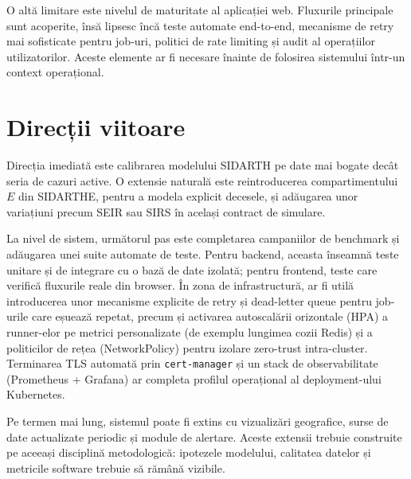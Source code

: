 O altă limitare este nivelul de maturitate al aplicației web. Fluxurile principale
sunt acoperite, însă lipsesc încă teste automate end-to-end, mecanisme de retry mai
sofisticate pentru job-uri, politici de rate limiting și audit al operațiilor
utilizatorilor. Aceste elemente ar fi necesare înainte de folosirea sistemului într-un
context operațional.

\section{Direcții viitoare}
\label{sec:directii_viitoare}

Direcția imediată este calibrarea modelului SIDARTH pe date mai bogate decât
seria de cazuri active. O extensie naturală este reintroducerea compartimentului
$E$ din SIDARTHE, pentru a modela explicit decesele, și adăugarea unor variațiuni
precum SEIR sau SIRS în același contract de simulare.

La nivel de sistem, următorul pas este completarea campaniilor de benchmark și
adăugarea unei suite automate de teste. Pentru backend, aceasta înseamnă teste
unitare și de integrare cu o bază de date izolată; pentru frontend, teste care
verifică fluxurile reale din browser. În zona de infrastructură, ar fi utilă
introducerea unor mecanisme explicite de retry și dead-letter queue pentru job-urile
care eșuează repetat, precum și activarea autoscalării orizontale (HPA) a
runner-elor pe metrici personalizate (de exemplu lungimea cozii Redis) și a
politicilor de rețea (NetworkPolicy) pentru izolare zero-trust intra-cluster.
Terminarea TLS automată prin \texttt{cert-manager} și un stack de
observabilitate (Prometheus + Grafana) ar completa profilul operațional al
deployment-ului Kubernetes.

Pe termen mai lung, sistemul poate fi extins cu vizualizări geografice, surse de
date actualizate periodic și module de alertare. Aceste extensii trebuie construite
pe aceeași disciplină metodologică: ipotezele modelului, calitatea datelor și
metricile software trebuie să rămână vizibile.
